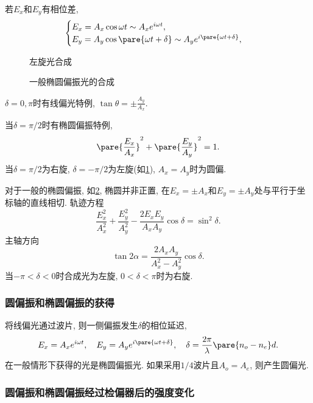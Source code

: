 \documentclass{ctexart}
\begin{document}
若$E_x$和$E_y$有相位差,
\[ \begin{cases}
    E_x = A_x \cos \omega t \sim A_x e^{i\omega t}, \\
    E_y = A_y \cos\pare{\omega t + \delta} \sim A_y e^{i\pare{\omega t + \delta}},
\end{cases} \]
\begin{figure}[ht]
    \centering
    \caption{左旋光合成}
    \label{fig:左旋光合成}
\end{figure}
\begin{figure}[htb]
    \centering
    \caption{一般椭圆偏振光的合成}
    \label{fig:一般椭圆偏振光的合成}
\end{figure}
\begin{cenum}
    \item $\delta = 0, \pi$时有线偏光特例, $\displaystyle \tan\theta = \pm \frac{A_y}{A_x}$.
    \item 当$\delta = \pi/2$时有椭圆偏振特例,
    \[ \pare{\frac{E_x}{A_x}}^2 + \pare{\frac{E_y}{A_y}}^2 = 1. \]
    当$\delta = \pi/2$为右旋, $\delta = -\pi/2$为左旋(如\cref{fig:左旋光合成}), $A_x=A_y$时为圆偏.
    \item 对于一般的椭圆偏振, 如\cref{fig:一般椭圆偏振光的合成}, 椭圆并非正置, 在$E_x = \pm A_x$和$E_y = \pm A_y$处与平行于坐标轴的直线相切. 轨迹方程
    \[ \frac{E_x^2}{A_x^2} + \frac{E_y^2}{A_y^2} - \frac{2E_xE_y}{A_xA_y} \cos\delta = \sin^2\delta. \]
    主轴方向
    \[ \tan 2\alpha = \frac{2A_xA_y}{A_x^2 - A_y^2}\cos\delta. \]
    当$-\pi < \delta < 0$时合成光为左旋, $0<\delta<\pi$时为右旋.
\end{cenum}


\subsubsection{圆偏振和椭圆偏振的获得} %
\label{ssub:圆偏振和椭圆偏振的获得}

将线偏光通过波片, 则一侧偏振发生$\delta$的相位延迟,
\[ E_x = A_x e^{i\omega t},\quad E_y = A_y e^{i\pare{\omega t + \delta}},\quad \delta = \frac{2\pi}{\lambda}\pare{n_o - n_e}d. \]
在一般情形下获得的光是椭圆偏振光. 如果采用$1/4$波片且$A_o = A_e$, 则产生圆偏光.


\subsubsection{圆偏振和椭圆偏振经过检偏器后的强度变化} %
\label{ssub:圆偏振和椭圆偏振经过检偏器后的强度变化}
\end{document}

